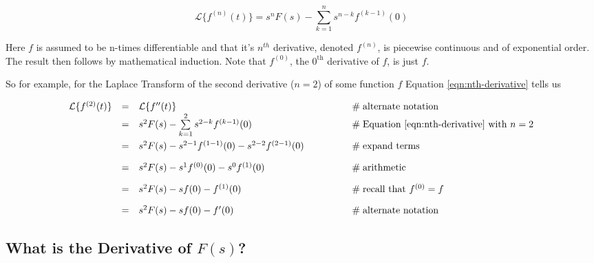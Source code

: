 \documentclass{article}
\theoremstyle{definition}
\begin{document}
\bigskip
\begin{equation}
\mathcal{L}\{f^{(n)}(t)\} =  s^{n}F(s)- \sum_{k=1}^n s^{n-k} f^{(k-1)}(0)
\label{eqn:nth-derivative}
\end{equation}

\bigskip  
\noindent
Here $f$ is assumed to be n-times differentiable and that it's $n^{th}$ derivative, denoted $f^{(n)}$, is piecewise continuous and of exponential order. The 
result then follows by mathematical induction. Note that $f^{(0)}$, the $0^{\text{th}}$ derivative of $f$, is just $f$.

\bigskip
\noindent
So for example, for the Laplace Transform of the second derivative ($n = 2$) of some function $f$ Equation \ref{eqn:nth-derivative} tells us

\begin{equation*}
\begin{array}{lllll}
\mathcal{L}\{f^{(2)}(t)\}  
&=& \mathcal{L}\{f^{\prime \prime}(t)\}                                                                   &\qquad \qquad \mathrel{\#} \text{alternate notation}                                                \\
&=&  s^{2}F(s)- \sum\limits_{k=1}^2 s^{2-k} f^{(k-1)}(0)                                         &\qquad \qquad \mathrel{\#} \text{Equation \ref{eqn:nth-derivative} with $n = 2$}    \\
[10pt]
&=&  s^{2}F(s)- s^{2-1}f^{(1-1)}(0)  - s^{2-2}f^{(2-1)}(0)                                         &\qquad \qquad \mathrel{\#} \text{expand terms}                                                      \\
[10pt]
&=&  s^{2}F(s)- s^{1}f^{(0)}(0)  - s^0f^{(1)}(0)                                                        &\qquad \qquad \mathrel{\#} \text{arithmetic}                                                             \\
[10pt]
&=&  s^{2}F(s)- sf(0)  - f^{(1)}(0)                                                                            &\qquad \qquad \mathrel{\#} \text{recall that $f^{(0)} = f$}                                          \\
[10pt]
&=& s^{2}F(s)- sf(0)  - f^{\prime}(0)                                                                       &\qquad \qquad \mathrel{\#} \text{alternate notation}
\end{array}
\end{equation*}


\subsection{What is the Derivative of $F(s)$?}
\end{document}
